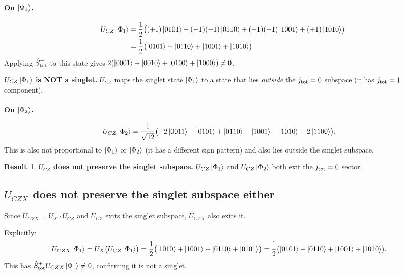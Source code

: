 \documentclass[11pt,a4paper]{article}
\theoremstyle{definition}
\newtheorem{result}{Result}
\begin{document}
\paragraph{On $\ket{\Phi_1}$.}
\begin{align*}
  U_{CZ}\ket{\Phi_1}
  &= \frac{1}{2}\bigl(
     (+1)\ket{0101} + (-1)(-1)\ket{0110} + (-1)(-1)\ket{1001} + (+1)\ket{1010}
     \bigr)\\
  &= \frac{1}{2}\bigl(\ket{0101}+\ket{0110}+\ket{1001}+\ket{1010}\bigr).
\end{align*}
Applying $\hat{S}^+_{\rm tot}$ to this state gives $2(\ket{0001}+\ket{0010}
+\ket{0100}+\ket{1000})\neq 0$.

\medskip
\noindent\textbf{$U_{CZ}\ket{\Phi_1}$ is NOT a singlet.}  $U_{CZ}$ maps the
singlet state $\ket{\Phi_1}$ to a state that lies \emph{outside} the
$j_{\rm tot}=0$ subspace (it has $j_{\rm tot}=1$ component).

\paragraph{On $\ket{\Phi_2}$.}
\begin{align*}
  U_{CZ}\ket{\Phi_2}
  &= \frac{1}{\sqrt{12}}\bigl(
     -2\ket{0011}-\ket{0101}+\ket{0110}+\ket{1001}-\ket{1010}-2\ket{1100}
     \bigr).
\end{align*}
This is also not proportional to $\ket{\Phi_1}$ or $\ket{\Phi_2}$
(it has a different sign pattern) and also lies outside the singlet subspace.

\begin{result}\label{res:UCZ-does-not-preserve}
  \textbf{$U_{CZ}$ does not preserve the singlet subspace.}
  $U_{CZ}\ket{\Phi_1}$ and $U_{CZ}\ket{\Phi_2}$ both exit the $j_{\rm tot}=0$
  sector.
\end{result}

\subsection{$U_{CZX}$ does not preserve the singlet subspace either}
\label{sub:UCZX}

Since $U_{CZX} = U_X\cdot U_{CZ}$ and $U_{CZ}$ exits the singlet subspace,
$U_{CZX}$ also exits it.

Explicitly:
\begin{align}
  U_{CZX}\ket{\Phi_1}
  &= U_X\bigl(U_{CZ}\ket{\Phi_1}\bigr)
   = \frac{1}{2}\bigl(\ket{1010}+\ket{1001}+\ket{0110}+\ket{0101}\bigr)
   = \frac{1}{2}\bigl(\ket{0101}+\ket{0110}+\ket{1001}+\ket{1010}\bigr).
\end{align}
This has $\hat{S}^+_{\rm tot}U_{CZX}\ket{\Phi_1}\neq 0$, confirming it is
not a singlet.
\end{document}
